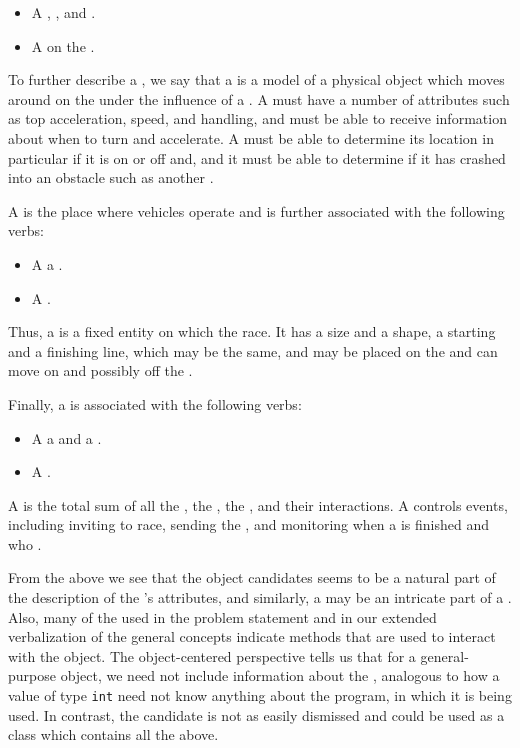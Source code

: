 \documentclass[fsharpNotes.tex]{subfiles}
\begin{document}
\begin{description}
\begin{description}
  \begin{itemize}
  \item A    , , and . 
  \item A   on the .
  \end{itemize}
  To further describe a , we say that a  is a model of a physical object which moves around on the  under the influence of a . A  must have a number of attributes such as top acceleration, speed, and handling, and must be able to receive information about when to turn and accelerate. A  must be able to determine its location in particular if it is on or off  and, and it must be able to determine if it has crashed into an obstacle such as another .
\item[\noun{track}] A  is the place where vehicles operate and is further associated with the following verbs:
  \begin{itemize}
  \item A   a .
  \item A   .
  \end{itemize}
  Thus, a  is a fixed entity on which the  race. It has a size and a shape, a starting and a finishing line, which may be the same, and  may be placed on the  and can move on and possibly off the .
\item[\noun{game}] Finally, a  is associated with the following verbs:
  \begin{itemize}
  \item A   a  and a . 
  \item A   .
  \end{itemize}
  A  is the total sum of all the , the , the , and their interactions. A  controls events, including inviting  to race, sending the , and monitoring when a  is finished and who .
\end{description}
From the above we see that the object candidates  seems to be a natural part of the description of the 's attributes, and similarly, a  may be an intricate part of a . Also, many of the  used in the problem statement and in our extended verbalization of the general concepts indicate methods that are used to interact with the object. The object-centered perspective tells us that for a general-purpose  object, we need not include information about the , analogous to how a value of type \lstinline|int| need not know anything about the program, in which it is being used. In contrast, the candidate  is not as easily dismissed and could be used as a class which contains all the above.


\end{description}
\end{document}
